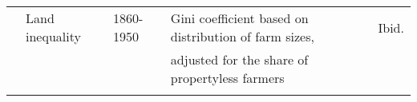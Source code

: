 \begin{tabular}{@{}l|llll@{}}
			      & Land inequality                                               & 1860-1950                         & Gini coefficient based on distribution of farm sizes,     & Ibid.   \\
  				&                  &          &  adjusted for the share of propertyless farmers           &  	\\   
                                   &                                                             &                            &               &            \\        
                                   

\end{tabular}
